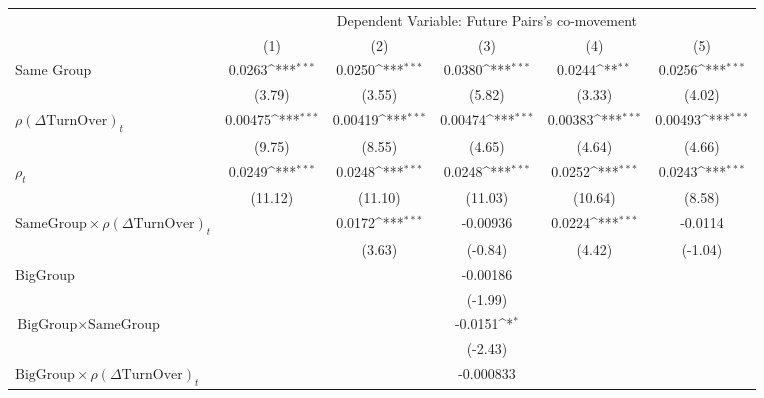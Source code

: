 {
\def\sym#1{\ifmmode^{#1}\else\(^{#1}\)\fi}
\begin{tabular}{l*{5}{c}}
\hline\hline
                &\multicolumn{5}{c}{Dependent Variable: Future Pairs's co-movement}                            \\\cmidrule(lr){2-6}
                &\multicolumn{1}{c}{(1)}         &\multicolumn{1}{c}{(2)}         &\multicolumn{1}{c}{(3)}         &\multicolumn{1}{c}{(4)}         &\multicolumn{1}{c}{(5)}         \\
\hline
Same Group      &   0.0263\sym{***}&   0.0250\sym{***}&   0.0380\sym{***}&   0.0244\sym{**} &   0.0256\sym{***}\\
                &   (3.79)         &   (3.55)         &   (5.82)         &   (3.33)         &   (4.02)         \\
[1em]
 $ {\rho(\Delta \text{TurnOver})_t} $ &  0.00475\sym{***}&  0.00419\sym{***}&  0.00474\sym{***}&  0.00383\sym{***}&  0.00493\sym{***}\\
                &   (9.75)         &   (8.55)         &   (4.65)         &   (4.64)         &   (4.66)         \\
[1em]
 $ {\rho_t} $   &   0.0249\sym{***}&   0.0248\sym{***}&   0.0248\sym{***}&   0.0252\sym{***}&   0.0243\sym{***}\\
                &  (11.12)         &  (11.10)         &  (11.03)         &  (10.64)         &   (8.58)         \\
[1em]
$ {\text{SameGroup} \times  {\rho(\Delta \text{TurnOver})_t} } $ &                  &   0.0172\sym{***}& -0.00936         &   0.0224\sym{***}&  -0.0114         \\
                &                  &   (3.63)         &  (-0.84)         &   (4.42)         &  (-1.04)         \\
[1em]
BigGroup        &                  &                  & -0.00186         &                  &                  \\
                &                  &                  &  (-1.99)         &                  &                  \\
[1em]
$ {\text{BigGroup} } \times {\text{SameGroup} }  $ &                  &                  &  -0.0151\sym{*}  &                  &                  \\
                &                  &                  &  (-2.43)         &                  &                  \\
[1em]
$ {\text{BigGroup} } \times {\rho(\Delta \text{TurnOver})_t}  $ &                  &                  &-0.000833         &                  &                  \\

\end{tabular}}
